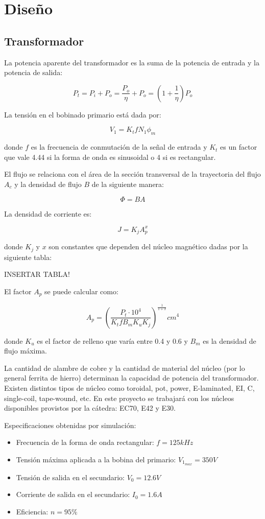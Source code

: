 \section{Diseño}

\subsection{Transformador}

La potencia aparente del transformador es la suma de la potencia de entrada y la potencia de salida:

$$ P_{t}=P_{i}+P_{o}=\frac{P_{o}}{\eta}+P_{o}=(1+\frac{1}{\eta})P_{o} $$

La tensión en el bobinado primario está dada por: 

$$ V_{1}=K_{t} f N_{1} \phi_{m} $$

donde $f$ es la frecuencia de conmutación de la señal de entrada y 
$K_t$ es un factor que vale 4.44 si la forma de onda es sinusoidal o 4 si es rectangular.

El flujo se relaciona con el área de la sección transversal de la trayectoria del flujo $A_{c}$ y la densidad de flujo $B$ de la siguiente manera:

$$ \Phi=BA $$

La densidad de corriente es:

$$ J=K_{j} A_{p}^{x} $$

donde $K_{j}$ y $x$ son constantes que dependen del núcleo magnético dadas por la siguiente tabla:

INSERTAR TABLA!

El factor $A_{p}$ se puede calcular como: 

$$ A_{p}=\left(\frac{P_{t} \cdot 10^{4}}{K_{t} f B_{m} K_{u} K_{j}}\right)^{\frac{1}{1+x}} {cm}^{4} $$

donde $K_u$ es el factor de relleno que varía entre 0.4 y 0.6 y $B_m$ es la densidad de flujo máxima.

La cantidad de alambre de cobre y la cantidad de material del núcleo (por lo general ferrita de hierro) determinan la capacidad de potencia del transformador. 
Existen distintos tipos de núcleo como toroidal, pot, power, E-laminated, EI, C, single-coil, tape-wound, etc. 
En este proyecto se trabajará con los núcleos disponibles provistos por la cátedra: EC70, E42 y E30. 

Especificaciones obtenidas por simulación:
\begin{itemize}
    \item Frecuencia de la forma de onda rectangular: $f=125kHz$
    \item Tensión máxima aplicada a la bobina del primario: $V_{1_{max}}=350V$
    \item Tensión de salida en el secundario: $V_{0}=12.6V$
    \item Corriente de salida en el secundario: $I_{0}=1.6A$
    \item Eficiencia: $n=95\%$
\end{itemize}

